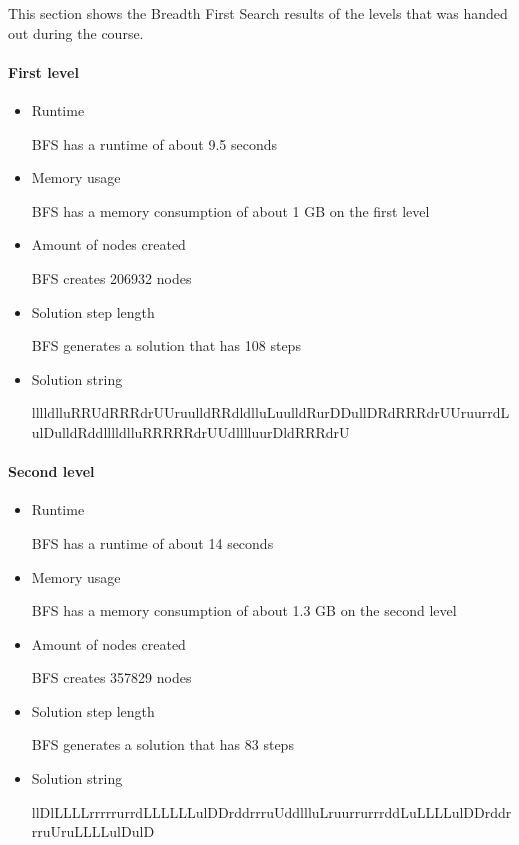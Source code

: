 \documentclass[../../main.tex]{subfiles}
\begin{document}
This section shows the Breadth First Search results of the levels that was handed out during the course.

\paragraph{First level}

 \begin{itemize}

	\item Runtime 		
 		
 	BFS has a runtime of about 9.5 seconds
 		
	\item Memory usage
		
	BFS has a memory consumption of about 1 GB on the first level
	
	\item Amount of nodes created
	
	BFS creates 206932 nodes
	
	\item Solution step length
	
	BFS generates a solution that has 108 steps
	
	\item Solution string
	
	lllldlluRRUdRRRdrUUruulldRRdldlluLuulldRurDDullDRdRRRdrUUruurrdLulDulldRddlllldlluRRRRRdrUUdlllluurDldRRRdrU
		
 \end{itemize}

\paragraph{Second level}

\begin{itemize}

	\item Runtime 		
 		
 	BFS has a runtime of about 14 seconds
 		
	\item Memory usage
		
	BFS has a memory consumption of about 1.3 GB on the second level
	
	\item Amount of nodes created
	
	BFS creates 357829 nodes
	
	\item Solution step length
	
	BFS generates a solution that has 83 steps
	
	\item Solution string
	
	llDlLLLLrrrrrurrdLLLLLLulDDrddrrruUddllluLruurrurrrddLuLLLLulDDrddrrruUruLLLLulDulD
		
 \end{itemize}
\end{document}
